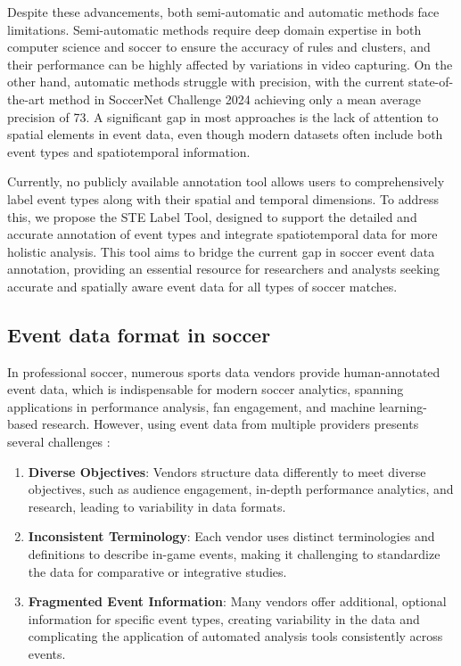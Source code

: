 Despite these advancements, both semi-automatic and automatic methods face limitations. Semi-automatic methods require deep domain expertise in both computer science and soccer to ensure the accuracy of rules and clusters, and their performance can be highly affected by variations in video capturing. On the other hand, automatic methods struggle with precision, with the current state-of-the-art method in SoccerNet Challenge 2024 \citep{cioppa2024soccernet2024challengesresults} achieving only a mean average precision of 73. A significant gap in most approaches is the lack of attention to spatial elements in event data, even though modern datasets often include both event types and spatiotemporal information.

Currently, no publicly available annotation tool allows users to comprehensively label event types along with their spatial and temporal dimensions. To address this, we propose the STE Label Tool, designed to support the detailed and accurate annotation of event types and integrate spatiotemporal data for more holistic analysis. This tool aims to bridge the current gap in soccer event data annotation, providing an essential resource for researchers and analysts seeking accurate and spatially aware event data for all types of soccer matches.



\subsection{Event data format in soccer}
\label{ssec:event_data_format_in_soccer}

In professional soccer, numerous sports data vendors provide human-annotated event data, which is indispensable for modern soccer analytics, spanning applications in performance analysis, fan engagement, and machine learning-based research. However, using event data from multiple providers presents several challenges \citep{decroos2020vaep}:

\begin{enumerate}
\item \textbf{Diverse Objectives}: Vendors structure data differently to meet diverse objectives, such as audience engagement, in-depth performance analytics, and research, leading to variability in data formats.

\item \textbf{Inconsistent Terminology}: Each vendor uses distinct terminologies and definitions to describe in-game events, making it challenging to standardize the data for comparative or integrative studies.

\item \textbf{Fragmented Event Information}: Many vendors offer additional, optional information for specific event types, creating variability in the data and complicating the application of automated analysis tools consistently across events.

\end{enumerate}

